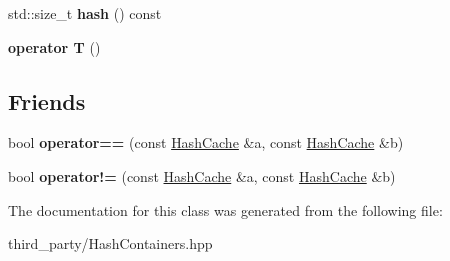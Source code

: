 \begin{DoxyCompactItemize}
\item 
\hypertarget{classemlib_1_1_hash_cache_a70c5d832b7ebff8a7529d376b814da0a}{std\+::size\+\_\+t {\bfseries hash} () const }\label{classemlib_1_1_hash_cache_a70c5d832b7ebff8a7529d376b814da0a}

\item 
\hypertarget{classemlib_1_1_hash_cache_a4363dc8d10211edb7a382b237ffe513e}{{\bfseries operator T} ()}\label{classemlib_1_1_hash_cache_a4363dc8d10211edb7a382b237ffe513e}

\end{DoxyCompactItemize}
\subsection*{Friends}
\begin{DoxyCompactItemize}
\item 
\hypertarget{classemlib_1_1_hash_cache_a0550206754039d0df4e806bd7eb3cc47}{bool {\bfseries operator==} (const \hyperlink{classemlib_1_1_hash_cache}{Hash\+Cache} \&a, const \hyperlink{classemlib_1_1_hash_cache}{Hash\+Cache} \&b)}\label{classemlib_1_1_hash_cache_a0550206754039d0df4e806bd7eb3cc47}

\item 
\hypertarget{classemlib_1_1_hash_cache_a8af92751260f2d083a827efbbdc19f96}{bool {\bfseries operator!=} (const \hyperlink{classemlib_1_1_hash_cache}{Hash\+Cache} \&a, const \hyperlink{classemlib_1_1_hash_cache}{Hash\+Cache} \&b)}\label{classemlib_1_1_hash_cache_a8af92751260f2d083a827efbbdc19f96}

\end{DoxyCompactItemize}


The documentation for this class was generated from the following file\+:\begin{DoxyCompactItemize}
\item 
third\+\_\+party/Hash\+Containers.\+hpp\end{DoxyCompactItemize}
